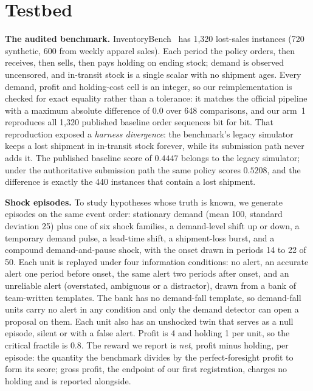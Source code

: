 \section{Testbed}
\label{sec:background}

\textbf{The audited benchmark.} InventoryBench~\cite{inventorybench} has 1{,}320 lost-sales
instances (720 synthetic, 600 from weekly apparel sales). Each period the policy orders, then
receives, then sells, then pays holding on ending stock; demand is observed uncensored, and
in-transit stock is a single scalar with no shipment ages. Every demand, profit and
holding-cost cell is an integer, so our
reimplementation is checked for exact equality rather than a tolerance: it matches the official
pipeline with a maximum absolute difference of $0.0$ over 648 comparisons, and our arm~1
reproduces all 1{,}320 published baseline order sequences bit for bit. That reproduction
exposed a \emph{harness divergence}\label{sec:divergence}: the benchmark's legacy simulator keeps
a lost shipment in in-transit stock forever, while its submission path never adds it. The
published baseline score of $0.4447$ belongs to the legacy simulator; under the authoritative
submission path the same policy scores $0.5208$, and the difference is exactly the 440
instances that contain a lost shipment.

\textbf{Shock episodes.} To study hypotheses whose truth is known, we generate episodes on the
same event order: stationary demand (mean 100, standard deviation 25) plus one of six shock
families, a demand-level shift up or down, a temporary demand pulse, a lead-time shift, a
shipment-loss burst, and a compound demand-and-pause shock, with the onset drawn in periods
14 to 22 of 50. Each unit is replayed under four information conditions: no alert, an accurate
alert one period before onset, the same alert two periods after onset, and an unreliable alert
(overstated, ambiguous or a distractor), drawn from a bank of team-written templates. The
bank has no demand-fall template, so demand-fall units carry no alert in any condition and
only the demand detector can open a proposal on them. Each unit also has an unshocked twin
that serves as a null episode, silent or with a false alert.
Profit is 4 and holding 1 per unit, so the critical fractile is $0.8$. The reward we report is
\emph{net}, profit minus holding, per episode: the quantity the benchmark divides by the
perfect-foresight profit to form its score; gross profit, the endpoint of our first
registration, charges no holding and is reported alongside.
